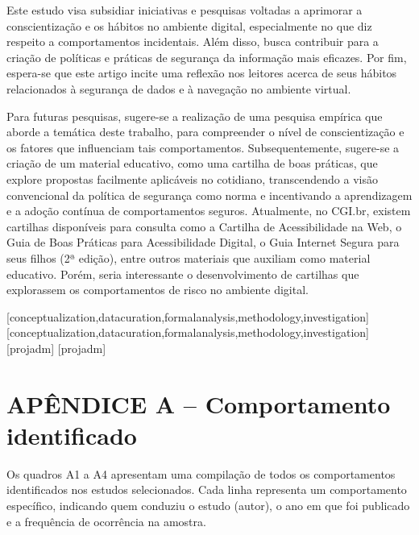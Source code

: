 \documentclass[portuguese]{textolivre}
\begin{document}
Este estudo visa subsidiar iniciativas e pesquisas voltadas a aprimorar a conscientização e os hábitos no ambiente digital, especialmente no que diz respeito a comportamentos incidentais. Além disso, busca contribuir para a criação de políticas e práticas de segurança da informação mais eficazes. Por fim, espera-se que este artigo incite uma reflexão nos leitores acerca de seus hábitos relacionados à segurança de dados e à navegação no ambiente virtual.

Para futuras pesquisas, sugere-se a realização de uma pesquisa empírica que aborde a temática deste trabalho, para compreender o nível de conscientização e os fatores que influenciam tais comportamentos. Subsequentemente, sugere-se a criação de um material educativo, como uma cartilha de boas práticas, que explore propostas facilmente aplicáveis no cotidiano, transcendendo a visão convencional da política de segurança como norma e incentivando a aprendizagem e a adoção contínua de comportamentos seguros. Atualmente, no CGI.br, existem cartilhas disponíveis para consulta como a Cartilha de Acessibilidade na Web, o Guia de Boas Práticas para Acessibilidade Digital, o Guia Internet Segura para seus filhos (2ª edição), entre outros materiais que auxiliam como material educativo. Porém, seria interessante o desenvolvimento de cartilhas que explorassem os comportamentos de risco no ambiente digital.


\printbibliography\label{sec-bib}
\begin{contributors}
[conceptualization,datacuration,formalanalysis,methodology,investigation]
[conceptualization,datacuration,formalanalysis,methodology,investigation]
[projadm]
[projadm]
\end{contributors}

\appendix
\section{APÊNDICE A – Comportamento identificado}\label{apx-longtable}

Os quadros A1 a A4 apresentam uma compilação de todos os comportamentos identificados nos estudos selecionados. Cada linha representa um comportamento específico, indicando quem conduziu o estudo (autor), o ano em que foi publicado e a frequência de ocorrência na amostra.
\end{document}
